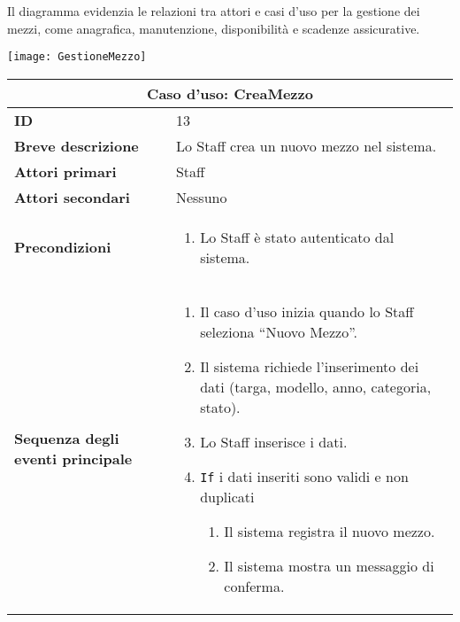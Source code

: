 \documentclass[a4paper]{report}
\begin{document}
\clearpage
{}

Il diagramma evidenzia le relazioni tra attori e casi d’uso per la gestione dei mezzi, come anagrafica, manutenzione, disponibilità e scadenze assicurative.

\begin{figure*}[ht]
    \centering
    \texttt{[image: GestioneMezzo]}
\end{figure*}

\clearpage
\begin{table}[H]
\vspace*{-0cm}
\renewcommand{\arraystretch}{1.9}
\begin{tabular}{|p{3.9cm}|p{9.9cm}|}
\hline
\multicolumn{2}{|c|}{\textbf{Caso d’uso: CreaMezzo}} \\ \hline
	\textbf{ID} & 13 \\ \hline
	\textbf{Breve descrizione} & Lo Staff crea un nuovo mezzo nel sistema. \\ \hline
	\textbf{Attori primari} & Staff \\ \hline
	\textbf{Attori secondari} & Nessuno \\ \hline
	\textbf{Precondizioni} & \begin{enumerate}[label=\arabic*.,leftmargin=14pt,labelsep=0.5em,topsep=0pt,partopsep=0pt,parsep=0pt,itemsep=0pt]
        \item Lo Staff è stato autenticato dal sistema.
    \end{enumerate} \\ \hline
	\textbf{Sequenza degli eventi principale} &
\begin{enumerate}[leftmargin=14pt,label=\arabic*.,labelsep=0.5em,topsep=0pt,partopsep=0pt,parsep=0pt,itemsep=0pt]
    \item Il caso d’uso inizia quando lo Staff seleziona “Nuovo Mezzo”.
    \item Il sistema richiede l’inserimento dei dati (targa, modello, anno, categoria, stato).
    \item Lo Staff inserisce i dati.
    \item \texttt{If} i dati inseriti sono validi e non duplicati
    \begin{enumerate}[label=\arabic{enumi}.\arabic*.,leftmargin=22pt,labelsep=0.5em,topsep=0pt,partopsep=0pt,parsep=0pt,itemsep=0pt]
        \item Il sistema registra il nuovo mezzo.
        \item Il sistema mostra un messaggio di conferma.
    \end{enumerate}

\end{enumerate}
\end{tabular}
\end{table}
\end{document}
